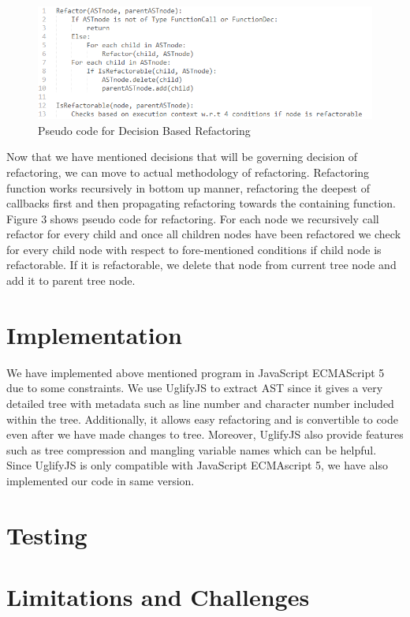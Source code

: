 \documentclass[10pt,conference]{IEEEtran}
\begin{document}
\begin{figure}[htbp]
	\includegraphics[scale=0.5]{code-decision-refactor.png}
	\caption{Pseudo code for Decision Based Refactoring}
	\label{fig}
\end{figure}

Now that we have mentioned decisions that will be governing decision of refactoring, we can move to actual methodology of refactoring. Refactoring function works recursively in bottom up manner, refactoring the deepest of callbacks first and then propagating refactoring towards the containing function. Figure 3 shows pseudo code for refactoring. For each node we recursively call refactor for every child and once all children nodes have been refactored we check for every child node with respect to fore-mentioned conditions if child node is refactorable. If it is refactorable, we delete that node from current tree node and add it to parent tree node.
\section{Implementation}
We have implemented above mentioned program in JavaScript ECMAScript 5 due to some constraints. We use UglifyJS to extract AST since it gives a very detailed tree with metadata such as line number and character number included within the tree. Additionally, it allows easy refactoring and is convertible to code even after we have made changes to tree. Moreover, UglifyJS also provide features such as tree compression and mangling variable names which can be helpful. Since UglifyJS is only compatible with JavaScript ECMAscript 5, we have also implemented our code in same version.

\section{Testing}
\section{Limitations and Challenges}
\end{document}
